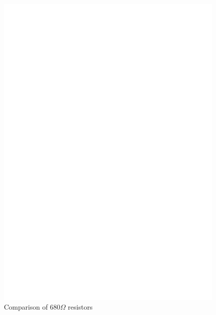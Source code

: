 \begin{enumerate}
\begin{figure}[H]
\centering
\includegraphics[width=17cm]{../FIG/Test2.eps}
\caption{Comparison of \(680\Omega\) resistors }
\label{fig:test2}
\end{figure}


\end{enumerate}
